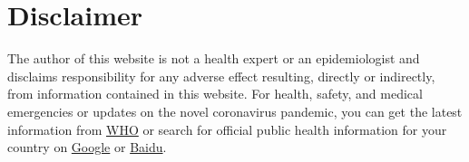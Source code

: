 \documentclass[12pt]{article}
\begin{document}
\section*{Disclaimer}
The author of this website is not a health expert or an epidemiologist and disclaims responsibility for any adverse effect resulting, directly or indirectly, from information contained in this website. For health, safety, and medical emergencies or updates on the novel coronavirus pandemic, you can get the latest information from \href{https://www.who.int/emergencies/diseases/novel-coronavirus-2019}{WHO} or search for official public health information for your country on \href{https://www.google.com/search?q=Coronavirus}{Google} or \href{https://www.baidu.com/}{Baidu}.



\end{document}
